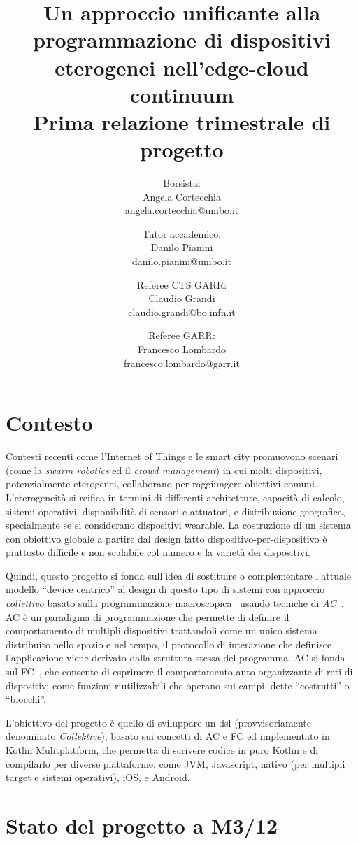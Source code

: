 \documentclass[13pt, a4paper]{article}
\title{\LARGE
    Un approccio unificante alla programmazione di dispositivi eterogenei nell'edge-cloud continuum \\ \small Prima relazione trimestrale di progetto
}
\author{
   Borsista: \\Angela Cortecchia \\ \small angela.cortecchia@unibo.it
    \and
    Tutor accademico: \\Danilo Pianini \\ \small danilo.pianini@unibo.it
    \and
    Referee CTS GARR: \\Claudio Grandi \\ \small claudio.grandi@bo.infn.it
    \and
    Referee GARR: \\Francesco Lombardo \\ \small francesco.lombardo@garr.it
}
\newcommand{\ck}{\emph{Collektive}}
\begin{document}
\maketitle
\clearpage


\section{Contesto}
\label{sec:context}

Contesti recenti come l'Internet of Things e le smart city promuovono scenari
(come la \emph{swarm robotics} ed il \emph{crowd management})
in cui molti dispositivi,
potenzialmente eterogenei, collaborano per raggiungere obiettivi comuni.
%
L'eterogeneità si reifica in termini di differenti architetture,
capacità di calcolo,
sistemi operativi,
disponibilità di sensori e attuatori,
e distribuzione geografica,
specialmente se si considerano dispositivi wearable.
%
La costruzione di un sistema con obiettivo globale a partire dal design fatto dispositivo-per-dispositivo
è piuttosto difficile e non scalabile col numero e la varietà dei dispositivi.

Quindi,
questo progetto si fonda sull'idea di sostituire o complementare l'attuale modello ``device centrico'' al design di questo tipo di sistemi
con approccio \emph{collettivo} basato sulla programmazione macroscopica~\cite{casadei22, JLAMP2019}
usando tecniche di \emph{\ac{AC}}~\cite{BealIEEEComputer2015}.
%
\ac{AC} è un paradigma di programmazione che permette di definire il comportamento di multipli dispositivi trattandoli
come un unico sistema distribuito nello spazio e nel tempo,
il protocollo di interazione che definisce l'applicazione viene derivato dalla struttura stessa del programma.
%
\ac{AC} si fonda sul \ac{FC}~\cite{TOCL2019},
che consente di esprimere il comportamento auto-organizzante di reti
di dispositivi come funzioni riutilizzabili che operano sui campi, dette ``costrutti'' o ``blocchi''.

L'obiettivo del progetto è quello di sviluppare un
\ac{dsl} (provvisoriamente denominato \ck{}),
basato sui concetti di \ac{AC} e \ac{FC} ed implementato in Kotlin Mulitplatform,
che permetta di scrivere codice in puro Kotlin e di compilarlo per diverse piattaforme:
come \ac{JVM}, Javascript, nativo (per multipli target e sistemi operativi), iOS, e Android.

\section{Stato del progetto a M3/12}\label{sec:stato-del-progetto-a-m3/12}
\end{document}
